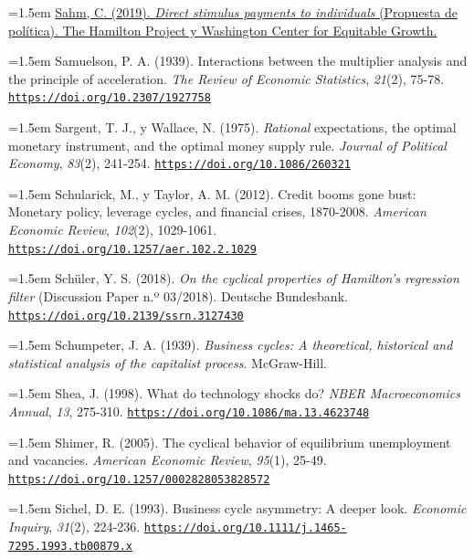 \documentclass[10pt,a4paper]{article}
\begin{document}
\noindent\hangindent=1.5em \href{https://www.hamiltonproject.org/papers/direct_stimulus_payments_to_individuals}{Sahm, C. (2019). \textit{Direct stimulus payments to individuals} (Propuesta de política). The Hamilton Project y Washington Center for Equitable Growth.}

\noindent\hangindent=1.5em Samuelson, P. A. (1939). Interactions between the multiplier analysis and the principle of acceleration. \textit{The Review of Economic Statistics}, \textit{21}(2), 75-78. \href{https://doi.org/10.2307/1927758}{\nolinkurl{https://doi.org/10.2307/1927758}}

\noindent\hangindent=1.5em Sargent, T. J., y Wallace, N. (1975). \textit{Rational} expectations, the optimal monetary instrument, and the optimal money supply rule. \textit{Journal of Political Economy}, \textit{83}(2), 241-254. \href{https://doi.org/10.1086/260321}{\nolinkurl{https://doi.org/10.1086/260321}}

{\sloppy\noindent\hangindent=1.5em Schularick, M., y Taylor, A. M. (2012). Credit booms gone bust: Monetary policy, leverage cycles, and financial crises, 1870-2008. \textit{American Economic Review}, \textit{102}(2), 1029-1061. \href{https://doi.org/10.1257/aer.102.2.1029}{\nolinkurl{https://doi.org/10.1257/aer.102.2.1029}}\par}

\noindent\hangindent=1.5em Schüler, Y. S. (2018). \textit{On the cyclical properties of Hamilton's regression filter} (Discussion Paper n.º 03/2018). Deutsche Bundesbank. \href{https://doi.org/10.2139/ssrn.3127430}{\nolinkurl{https://doi.org/10.2139/ssrn.3127430}}

\noindent\hangindent=1.5em Schumpeter, J. A. (1939). \textit{Business cycles: A theoretical, historical and statistical analysis of the capitalist process}. McGraw-Hill.

\noindent\hangindent=1.5em Shea, J. (1998). What do technology shocks do? \textit{NBER Macroeconomics Annual}, \textit{13}, 275-310. \href{https://doi.org/10.1086/ma.13.4623748}{\nolinkurl{https://doi.org/10.1086/ma.13.4623748}}

\noindent\hangindent=1.5em Shimer, R. (2005). The cyclical behavior of equilibrium unemployment and vacancies. \textit{American Economic Review}, \textit{95}(1), 25-49. \href{https://doi.org/10.1257/0002828053828572}{\nolinkurl{https://doi.org/10.1257/0002828053828572}}

\noindent\hangindent=1.5em Sichel, D. E. (1993). Business cycle asymmetry: A deeper look. \textit{Economic Inquiry}, \textit{31}(2), 224-236. \href{https://doi.org/10.1111/j.1465-7295.1993.tb00879.x}{\nolinkurl{https://doi.org/10.1111/j.1465-7295.1993.tb00879.x}}
\end{document}
